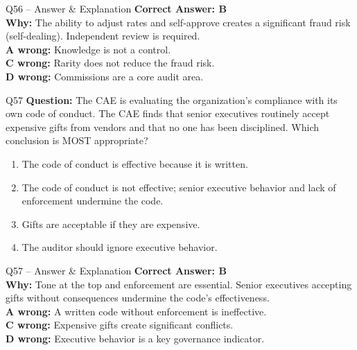 \documentclass[aspectratio=169,10pt]{beamer}
\begin{document}
	\begin{frame}[t]{Q56 -- Answer \& Explanation}
		\small
		\textbf{Correct Answer: B} \\[4pt]
		\textbf{Why:} The ability to adjust rates and self-approve creates a significant fraud risk (self-dealing). Independent review is required. \\[4pt]
		\textbf{A wrong:} Knowledge is not a control. \\[2pt]
		\textbf{C wrong:} Rarity does not reduce the fraud risk. \\[2pt]
		\textbf{D wrong:} Commissions are a core audit area.
	\end{frame}
	
	\begin{frame}[t]{Q57}
		\small
		\textbf{Question:} The CAE is evaluating the organization's compliance with its own code of conduct. The CAE finds that senior executives routinely accept expensive gifts from vendors and that no one has been disciplined. Which conclusion is MOST appropriate?
		\begin{enumerate}[label=\Alph*.,itemsep=1pt,topsep=2pt]
			\item The code of conduct is effective because it is written.
			\item The code of conduct is not effective; senior executive behavior and lack of enforcement undermine the code.
			\item Gifts are acceptable if they are expensive.
			\item The auditor should ignore executive behavior.
		\end{enumerate}
	\end{frame}
	
	\begin{frame}[t]{Q57 -- Answer \& Explanation}
		\small
		\textbf{Correct Answer: B} \\[4pt]
		\textbf{Why:} Tone at the top and enforcement are essential. Senior executives accepting gifts without consequences undermine the code's effectiveness. \\[4pt]
		\textbf{A wrong:} A written code without enforcement is ineffective. \\[2pt]
		\textbf{C wrong:} Expensive gifts create significant conflicts. \\[2pt]
		\textbf{D wrong:} Executive behavior is a key governance indicator.
	\end{frame}
	
\end{document}
